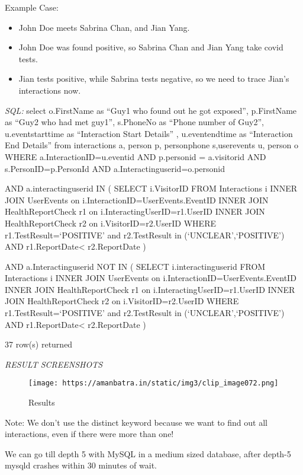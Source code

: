\documentclass[
]{article}
\providecommand{\tightlist}{%
  \setlength{\itemsep}{0pt}\setlength{\parskip}{0pt}}
\begin{document}
Example Case:

\begin{itemize}
\tightlist
\item
  John Doe meets Sabrina Chan, and Jian Yang.
\item
  John Doe was found positive, so Sabrina Chan and Jian Yang take covid
  tests.
\item
  Jian tests positive, while Sabrina tests negative, so we need to trace
  Jian's interactions now.
\end{itemize}

\emph{SQL:} select o.FirstName as ``Guy1 who found out he got exposed'',
p.FirstName as ``Guy2 who had met guy1'', s.PhoneNo as ``Phone number of
Guy2'', u.eventstarttime as ``Interaction Start Details'' ,
u.eventendtime as ``Interaction End Details'' from interactions a,
person p, personphone s,userevents u, person o WHERE
a.InteractionID=u.eventid AND p.personid = a.visitorid AND
s.PersonID=p.PersonId AND a.Interactinguserid=o.personid

AND a.interactinguserid IN ( SELECT i.VisitorID FROM Interactions i
INNER JOIN UserEvents on i.InteractionID=UserEvents.EventID INNER JOIN
HealthReportCheck r1 on i.InteractingUserID=r1.UserID INNER JOIN
HealthReportCheck r2 on i.VisitorID=r2.UserID WHERE
r1.TestResult=`POSITIVE' and r2.TestResult in (`UNCLEAR',`POSITIVE') AND
r1.ReportDate\textless{} r2.ReportDate )

AND a.Interactinguserid NOT IN ( SELECT i.interactinguserid FROM
Interactions i INNER JOIN UserEvents on
i.InteractionID=UserEvents.EventID INNER JOIN HealthReportCheck r1 on
i.InteractingUserID=r1.UserID INNER JOIN HealthReportCheck r2 on
i.VisitorID=r2.UserID WHERE r1.TestResult=`POSITIVE' and r2.TestResult
in (`UNCLEAR',`POSITIVE') AND r1.ReportDate\textless{} r2.ReportDate )

37 row(s) returned

\emph{RESULT SCREENSHOTS}

\begin{figure}
\centering
\texttt{[image: https://amanbatra.in/static/img3/clip\_image072.png]}
\caption{Results}
\end{figure}

Note: We don't use the distinct keyword because we want to find out all
interactions, even if there were more than one!

We can go till depth 5 with MySQL in a medium sized database, after
depth-5 mysqld crashes within 30 minutes of wait.
\end{document}
